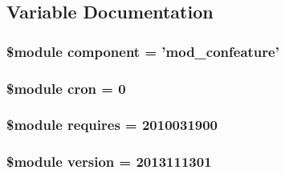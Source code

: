 \subsection{Variable Documentation}
\hypertarget{version_8php_ac89a4ebe36a201f6c83db18ec8abbebd}{
\subsubsection[{component}]{\setlength{\rightskip}{0pt plus 5cm}\$module component = 'mod\-\_\-confeature'}}\label{version_8php_ac89a4ebe36a201f6c83db18ec8abbebd}
\hypertarget{version_8php_ac5478dfb9d76c36e604131b38740821a}{
\subsubsection[{cron}]{\setlength{\rightskip}{0pt plus 5cm}\$module cron = 0}}\label{version_8php_ac5478dfb9d76c36e604131b38740821a}
\hypertarget{version_8php_a4c0ff460b6d47c1f7d1a74f2f5d74b9f}{
\subsubsection[{requires}]{\setlength{\rightskip}{0pt plus 5cm}\$module requires = 2010031900}}\label{version_8php_a4c0ff460b6d47c1f7d1a74f2f5d74b9f}
\hypertarget{version_8php_a1e2b2712a04f3a2db37b7057e4692a62}{
\subsubsection[{version}]{\setlength{\rightskip}{0pt plus 5cm}\$module version = 2013111301}}\label{version_8php_a1e2b2712a04f3a2db37b7057e4692a62}
